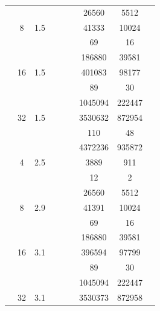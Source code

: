 \begin{table}[htbp]
\begin{tabular}{l S[table-format=3.0] S[table-format=4.1] l S[table-format=6.0] S[table-format=6.0] S[table-format=6.0] S[table-format=5.0] S[table-format=2.0]}
     &  &  &  & {\text{---}} & {\text{---}} & 26560 & 5512 & {\text{---}} \\
     & 8 & 1.5 &  & {\text{---}} & {\text{---}} & 41333 & 10024 & {\text{---}} \\
     &  &  &  & {\text{---}} & {\text{---}} & 69 & 16 & {\text{---}} \\
     &  &  &  & {\text{---}} & {\text{---}} & 186880 & 39581 & {\text{---}} \\
     & 16 & 1.5 &  & {\text{---}} & {\text{---}} & 401083 & 98177 & {\text{---}} \\
     &  &  &  & {\text{---}} & {\text{---}} & 89 & 30 & {\text{---}} \\
     &  &  &  & {\text{---}} & {\text{---}} & 1045094 & 222447 & {\text{---}} \\
     & 32 & 1.5 &  & {\text{---}} & {\text{---}} & 3530632 & 872954 & {\text{---}} \\
     &  &  &  & {\text{---}} & {\text{---}} & 110 & 48 & {\text{---}} \\
     &  &  &  & {\text{---}} & {\text{---}} & 4372236 & 935872 & {\text{---}} \\
    \midrule
     & 4 & 2.5 &  & {\text{---}} & {\text{---}} & 3889 & 911 & {\text{---}} \\
     &  &  &  & {\text{---}} & {\text{---}} & 12 & 2 & {\text{---}} \\
     &  &  &  & {\text{---}} & {\text{---}} & 26560 & 5512 & {\text{---}} \\
     & 8 & 2.9 &  & {\text{---}} & {\text{---}} & 41391 & 10024 & {\text{---}} \\
     &  &  &  & {\text{---}} & {\text{---}} & 69 & 16 & {\text{---}} \\
     &  &  &  & {\text{---}} & {\text{---}} & 186880 & 39581 & {\text{---}} \\
     & 16 & 3.1 &  & {\text{---}} & {\text{---}} & 396594 & 97799 & {\text{---}} \\
     &  &  &  & {\text{---}} & {\text{---}} & 89 & 30 & {\text{---}} \\
     &  &  &  & {\text{---}} & {\text{---}} & 1045094 & 222447 & {\text{---}} \\
     & 32 & 3.1 &  & {\text{---}} & {\text{---}} & 3530373 & 872958 & {\text{---}} \\

\end{tabular}
\end{table}
